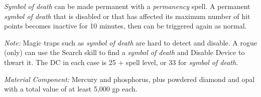 \textit{Symbol of death} can be made permanent with a \textit{permanency} spell. 
A permanent \textit{symbol of death} that is disabled or that has affected its 
maximum number of hit points becomes inactive for 10 minutes, then can be triggered 
again as normal.

\textit{Note:} Magic traps such as \textit{symbol of death} are hard to detect 
and disable. A rogue (only) can use the Search skill to find a \textit{symbol of 
death} and Disable Device to thwart it. The DC in each case is 25 + spell level, 
or 33 for \textit{symbol of death}.

\textit{Material Component:} Mercury and phosphorus, plus powdered diamond and 
opal with a total value of at least 5,000 gp each.

